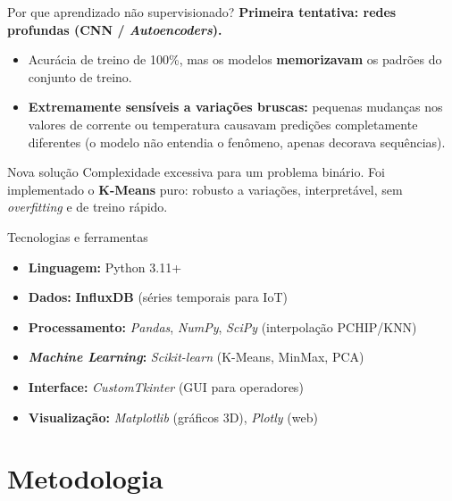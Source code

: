 \documentclass{beamer}
\begin{document}
\begin{frame}{Por que aprendizado não supervisionado?}
    \textbf{Primeira tentativa: redes profundas (CNN / \textit{Autoencoders}).}
    \begin{itemize}
        \item Acurácia de treino de 100\%, mas os modelos \textbf{memorizavam} os padrões do conjunto de treino.
        \item \textbf{Extremamente sensíveis a variações bruscas:} pequenas mudanças nos valores de corrente ou temperatura causavam predições completamente diferentes (o modelo não entendia o fenômeno, apenas decorava sequências).
    \end{itemize}
    \vspace{0.2cm}
    \begin{block}{Nova solução}
        Complexidade excessiva para um problema binário. Foi implementado o \textbf{K-Means} puro: robusto a variações, interpretável, sem \textit{overfitting} e de treino rápido.
    \end{block}
\end{frame}

\begin{frame}{Tecnologias e ferramentas}
    \begin{itemize}
        \item \textbf{Linguagem:} Python 3.11+
        \item \textbf{Dados:} \textbf{InfluxDB} (séries temporais para IoT)
        \item \textbf{Processamento:} \textit{Pandas}, \textit{NumPy}, \textit{SciPy} (interpolação PCHIP/KNN)
        \item \textbf{\textit{Machine Learning}:} \textit{Scikit-learn} (K-Means, MinMax, PCA)
        \item \textbf{Interface:} \textit{CustomTkinter} (GUI para operadores)
        \item \textbf{Visualização:} \textit{Matplotlib} (gráficos 3D), \textit{Plotly} (web)
    \end{itemize}
\end{frame}

\section{Metodologia}
\end{document}
